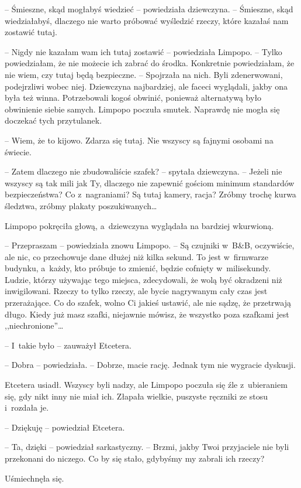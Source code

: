\documentclass[oneside,polish,11pt,sfheadings]{mwbk}
\begin{document}
-- Śmieszne, skąd mogłabyś wiedzieć -- powiedziała dziewczyna. -- Śmieszne,
skąd wiedziałabyś, dlaczego nie warto próbować wyśledzić rzeczy, które
kazałaś nam zostawić tutaj.

-- Nigdy nie kazałam wam ich tutaj zostawić -- powiedziała Limpopo. -- Tylko powiedziałam, że nie możecie ich zabrać do środka. Konkretnie
powiedziałam, że nie wiem, czy tutaj będą bezpieczne. -- Spojrzała na
nich. Byli zdenerwowani, podejrzliwi wobec niej. Dziewczyna
najbardziej, ale faceci wyglądali, jakby ona była też winna.
Potrzebowali kogoś obwinić, ponieważ alternatywą było obwinienie siebie
samych. Limpopo poczuła smutek. Naprawdę nie mogła się doczekać tych
przytulanek.

-- Wiem, że to kijowo. Zdarza się tutaj. Nie wszyscy są fajnymi osobami
na świecie.

-- Zatem dlaczego nie zbudowaliście szafek? -- spytała dziewczyna. -- Jeżeli nie wszyscy są tak mili jak Ty, dlaczego nie zapewnić gościom
minimum standardów bezpieczeństwa? Co z~nagraniami? Są tutaj kamery,
racja? Zróbmy trochę kurwa śledztwa, zróbmy plakaty poszukiwanych\ldots 

Limpopo pokręciła głową, a~dziewczyna wyglądała na bardziej wkurwioną. 

-- Przepraszam -- powiedziała znowu Limpopo. -- Są czujniki w~B\&B,
oczywiście, ale nic, co przechowuje dane dłużej niż kilka sekund. To
jest w~firmwarze budynku, a~każdy, kto próbuje to zmienić, będzie
cofnięty w~milisekundy. Ludzie, którzy używając tego miejsca,
zdecydowali, że wolą być okradzeni niż inwigilowani. Rzeczy to tylko
rzeczy, ale bycie nagrywanym cały czas jest przerażające. Co do szafek,
wolno Ci jakieś ustawić, ale nie sądzę, że przetrwają długo. Kiedy już
masz szafki, niejawnie mówisz, że wszystko poza szafkami jest
,,niechronione''\ldots 

-- I~takie było -- zauważył Etcetera.

-- Dobra -- powiedziała. -- Dobrze, macie rację. Jednak tym nie wygracie
dyskusji.

Etcetera usiadł. Wszyscy byli nadzy, ale Limpopo poczuła się źle z~ubieraniem się, gdy nikt inny nie miał ich. Złapała wielkie, puszyste
ręczniki ze stosu i~rozdała je.

-- Dziękuję -- powiedział Etcetera.

-- Ta, dzięki -- powiedział sarkastyczny. -- Brzmi, jakby Twoi przyjaciele
nie byli przekonani do niczego. Co by się stało, gdybyśmy my zabrali ich
rzeczy?

Uśmiechnęła się. 
\end{document}
